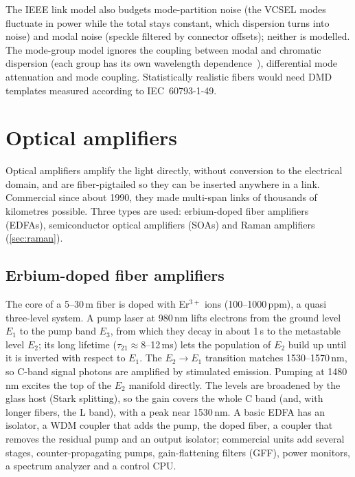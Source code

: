\begin{pitfall}
The IEEE link model also budgets mode-partition noise (the VCSEL modes fluctuate in power while
the total stays constant, which dispersion turns into noise) and modal noise (speckle filtered by
connector offsets); neither is modelled. The mode-group model ignores the coupling between modal
and chromatic dispersion (each group has its own wavelength dependence~\cite{golowich2003}),
differential mode attenuation and mode coupling. Statistically realistic fibers would need DMD
templates measured according to IEC~60793-1-49.
\end{pitfall}

\section{Optical amplifiers}\label{sec:amplifiers}
Optical amplifiers amplify the light directly, without conversion to the electrical domain,
and are fiber-pigtailed so they can be inserted anywhere in a link. Commercial since about
1990, they made multi-span links of thousands of kilometres possible. Three types are used:
erbium-doped fiber amplifiers (EDFAs), semiconductor optical amplifiers (SOAs) and Raman
amplifiers (\cref{sec:raman}).

\subsection{Erbium-doped fiber amplifiers}
The core of a 5--30\,m fiber is doped with Er$^{3+}$ ions (100--1000\,ppm), a quasi three-level system.
A pump laser at 980\,nm lifts electrons from the ground level $E_1$ to the pump band $E_3$, from
which they decay in about 1\,\textmu s to the metastable level $E_2$; its long lifetime
($\tau_{21}\approx8$--12\,ms) lets the population of $E_2$ build up until it is inverted with respect to
$E_1$. The $E_2\to E_1$ transition matches 1530--1570\,nm, so C-band signal photons are amplified by
stimulated emission. Pumping at 1480\,nm excites the top of the $E_2$ manifold directly. The levels
are broadened by the glass host (Stark splitting), so the gain covers the whole C band (and, with
longer fibers, the L band), with a peak near 1530\,nm. A basic EDFA has an isolator, a WDM coupler
that adds the pump, the doped fiber, a coupler that removes the residual pump and an output
isolator; commercial units add several stages, counter-propagating pumps, gain-flattening filters
(GFF), power monitors, a spectrum analyzer and a control CPU.

